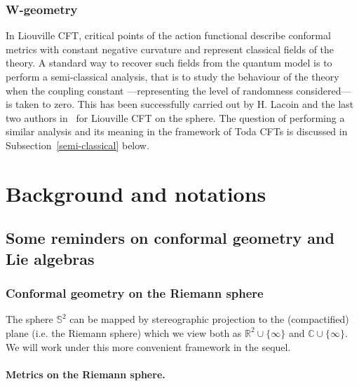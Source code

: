 \documentclass[AHL,Unicode,longabstracts,published]{cedram}
\newcommand{\C}{\mathbb{C}}
\newcommand{\R}{\mathbb{R}}
\renewcommand*\S{\mathbb{S}}
\begin{document}
\subsubsection*{W-geometry}
 In Liouville CFT, critical points of the action functional describe conformal metrics with constant negative curvature and represent classical fields of the theory. A standard way to recover such fields from the quantum model is to perform a semi-classical analysis, that is to study the behaviour of the theory when the coupling constant ---representing the level of randomness considered--- is taken to zero. This has been successfully carried out by H. Lacoin and the last two authors in~\cite{LRV19} for Liouville CFT on the sphere. The question of performing a similar analysis and its meaning in the framework of Toda CFTs is discussed in Subsection~\ref{semi-classical} below.


\section{Background and notations}\label{section_background}



\subsection{Some reminders on conformal geometry and Lie algebras}


\subsubsection{Conformal geometry on the Riemann sphere}

The sphere $\S^2$ can be mapped by stereographic projection to the (compactified) plane (i.e. the Riemann sphere) which we view both as ${\R^2}\cup\lbrace\infty\rbrace$ and $\C\cup\lbrace\infty\rbrace$. We will work under this more convenient framework in the sequel.

\paragraph{Metrics on the Riemann sphere.}
\end{document}
